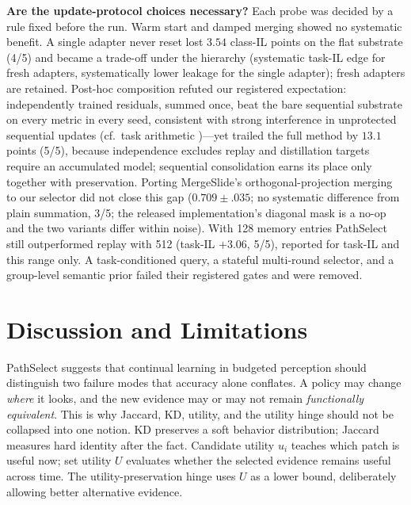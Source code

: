\documentclass{article}
\begin{document}
\textbf{Are the update-protocol choices necessary?}
Each probe was decided by a rule fixed before the run. Warm start and damped merging showed no systematic benefit. A single adapter never reset lost $3.54$ class-IL points on the flat substrate (4/5) and became a trade-off under the hierarchy (systematic task-IL edge for fresh adapters, systematically lower leakage for the single adapter); fresh adapters are retained. Post-hoc composition refuted our registered expectation: independently trained residuals, summed once, beat the bare sequential substrate on every metric in every seed, consistent with strong interference in unprotected sequential updates (cf.\ task arithmetic \cite{ilharco2023task})---yet trailed the full method by $13.1$ points (5/5), because independence excludes replay and distillation targets require an accumulated model; sequential consolidation earns its place only together with preservation. Porting MergeSlide's orthogonal-projection merging \cite{bui2026mergeslide} to our selector did not close this gap ($0.709{\pm}.035$; no systematic difference from plain summation, 3/5; the released implementation's diagonal mask is a no-op and the two variants differ within noise). With 128 memory entries PathSelect still outperformed replay with 512 (task-IL $+3.06$, 5/5), reported for task-IL and this range only. A task-conditioned query, a stateful multi-round selector, and a group-level semantic prior failed their registered gates and were removed.

\FloatBarrier
\section{Discussion and Limitations}
\label{sec:discussion}

PathSelect suggests that continual learning in budgeted perception should distinguish two failure modes that accuracy alone conflates.
A policy may change \emph{where} it looks, and the new evidence may or may not remain \emph{functionally equivalent}.
This is why Jaccard, KD, utility, and the utility hinge should not be collapsed into one notion.
KD preserves a soft behavior distribution; Jaccard measures hard identity after the fact.
Candidate utility $u_i$ teaches which patch is useful now; set utility $U$ evaluates whether the selected evidence remains useful across time.
The utility-preservation hinge uses $U$ as a lower bound, deliberately allowing better alternative evidence.
\end{document}
